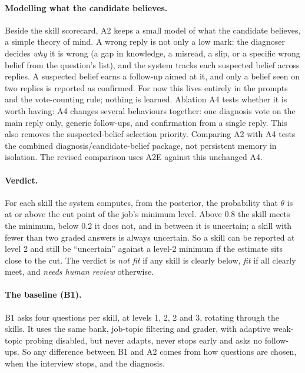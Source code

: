 \documentclass[11pt,a4paper]{article}
\begin{document}
\paragraph{Modelling what the candidate believes.} Beside the skill scorecard, A2 keeps a small
model of what the candidate believes, a simple theory of mind. A wrong reply is not only a low mark:
the diagnoser decides \emph{why} it is wrong (a gap in knowledge, a misread, a slip, or a specific
wrong belief from the question's list), and the system tracks each suspected belief across replies.
A suspected belief earns a follow-up aimed at it, and only a belief seen on two replies is reported
as confirmed. For now this lives entirely in the prompts and the vote-counting rule; nothing is
learned. Ablation A4 tests whether it is worth having: A4 changes several behaviours together: one diagnosis vote on the main reply only, generic
follow-ups, and confirmation from a single reply. This also removes the suspected-belief
selection priority. Comparing A2 with A4 tests the combined diagnosis/candidate-belief package,
not persistent memory in isolation. The revised comparison uses A2E against this unchanged A4.

\paragraph{Verdict.} For each skill the system computes, from the posterior, the probability that
$\theta$ is at or above the cut point of the job's minimum level. Above 0.8 the skill meets the
minimum, below 0.2 it does not, and in between it is uncertain; a skill with fewer than two graded
answers is always uncertain. So a skill can be reported at level 2 and still be ``uncertain''
against a level-2 minimum if the estimate sits close to the cut. The verdict is \emph{not fit} if any skill is clearly below, \emph{fit} if
all clearly meet, and \emph{needs human review} otherwise.

\paragraph{The baseline (B1).} B1 asks four questions per skill, at levels 1, 2, 2 and 3, rotating
through the skills. It uses the same bank, job-topic filtering and grader, with adaptive weak-topic probing disabled,
but never adapts, never stops early and asks no follow-ups. So any difference between B1 and A2
comes from how questions are chosen, when the interview stops, and the diagnosis.
\end{document}
